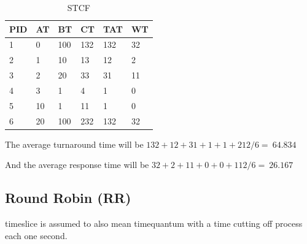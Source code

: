 \documentclass[11pt,a4paper]{article}
\theoremstyle{plain}
\theoremstyle{definition}
\theoremstyle{remark}
\numberwithin{equation}{section}
\begin{document}
\begin{table}[H]
	\centering
	\caption{STCF}
	\label{t2-stcf}
	\begin{tabular}{llllll}
		\hline
		\multicolumn{1}{|l|}{PID} & \multicolumn{1}{l|}{AT} & \multicolumn{1}{l|}{BT} & \multicolumn{1}{l|}{CT} & \multicolumn{1}{l|}{TAT} & \multicolumn{1}{l|}{WT} \\ \hline
		1                         & 0                       & 100                     & 132                     & 132                      & 32                      \\
		2                         & 1                       & 10                      & 13                      & 12                       & 2                       \\
		3                         & 2                       & 20                      & 33                      & 31                       & 11                      \\
		4                         & 3                       & 1                       & 4                       & 1                        & 0                       \\
		5                         & 10                      & 1                       & 11                      & 1                        & 0                       \\
		6                         & 20                      & 100                     & 232                     & 132                      & 32                     
	\end{tabular}
\end{table}

The average turnaround time will be $132+12+31+1+1+212/6=~64.834$

And the average response time will be $32+2+11+0+0+112/6=~26.167$

\subsection*{Round Robin (RR)}

timeslice is assumed to also mean timequantum with a time cutting off process each one second.
\end{document}
